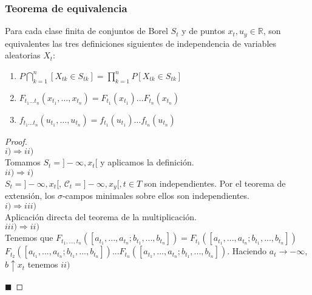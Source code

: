 \documentclass[12pt,a4paper]{book}
\newcommand*{\qed}{\hfill\ensuremath{\blacksquare}}
\begin{document}
\subsubsection{Teorema de equivalencia}
\begin{theorem}
Para cada clase finita de conjuntos de Borel $S_t$ y de puntos $x_t, u_y \in \mathbb{R}$, son equivalentes las tres definiciones siguientes de independencia de variables aleatorias $X_t$:
\begin{enumerate}
\item $P\bigcap_{k=1}^n [X_{tk}\in S_{tk}]=\displaystyle\prod_{k=1}^n P[X_{tk}\in S_{tk}]$
\item $F_{t_1\ldots t_n}(x_{t_1},\ldots ,x_{t_n})=F_{t_1}(x_{t_1})\ldots F_{t_n}(x_{t_n})$
\item $f_{t_1\ldots t_n}(u_{t_1},\ldots ,u_{t_n})=f_{t_1}(u_{t_1})\ldots f_{t_n}(u_{t_n})$
\end{enumerate}
\end{theorem}
\begin{proof}$\,$\\
$i) \Rightarrow ii)$\\
Tomamos $S_t = ]-\infty, x_t[$ y aplicamos la definición.\\
$ii) \Rightarrow i)$\\
$S_t = ]-\infty, x_t[$,  $\mathcal{C}_t = {]-\infty, x_y[, t \in T}$ 
son independientes. 
Por el teorema de extensión, los $\sigma$-campos minimales sobre ellos son independientes.\\
$i) \Rightarrow iii)$\\
Aplicación directa del teorema de la multiplicación.\\
$iii) \Rightarrow ii)$\\
Tenemos que $F_{t_1,...,t_n}([a_{t_1},...,a_{t_n};b_{t_1},...,b_{t_n}]) = F_{t_1}([a_{t_1},...,a_{t_n};b_{t_1},...,b_{t_n}])$\\$F_{t_2}([a_{t_1},...,a_{t_n};b_{t_1},...,b_{t_n}])...F_{t_n}([a_{t_1},...,a_{t_n};b_{t_1},...,b_{t_n}])$. Haciendo $a_t \rightarrow - \infty$, $b \uparrow x_t$ tenemos $ii)$

\qed
\end{proof}
\end{document}
